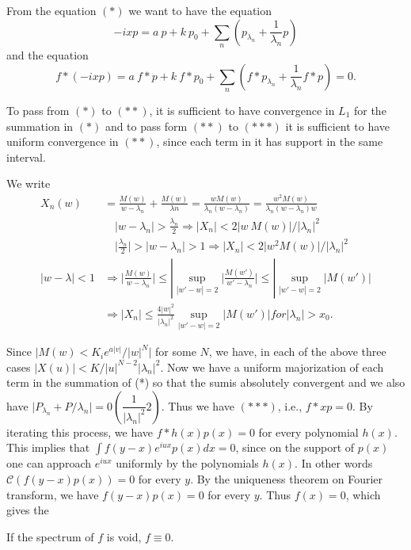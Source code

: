 From the equation $(*)$ we want to have the equation
\begin{equation}
 - ixp = a ~ p+ k ~ p_0 + \sum_n (p_{\lambda_n} + \frac{1}{\lambda_n} p) \tag{**}
\end{equation}
and the equation
\begin{equation}
 f * (-ixp) = a ~ f * p + k ~ f * p_0 + \sum_n (f * p_{\lambda_n} +
 \frac{1}{\lambda_n} f * p) = 0. \tag{***} 
\end{equation}

To pass from $(*)$ to $(**)$, it is sufficient to have convergence in
$L_1$ for the summation in $(*)$ and to pass form $(**)$ to $(***)$
it is sufficient to have uniform convergence in $(**)$, since each
term in it has support in the same interval. 

We write
\begin{align*}
X_n (w) & = \frac{M(w)}{w - \lambda_n} + \frac{M(w)}{\lambda n} =
\frac{w M(w)}{\lambda_n (w - \lambda_n)} = \frac{w^2 M(w)}{\lambda_n
 (w - \lambda_n)w} \\
 & \quad \big| w - \lambda_n \big| > \frac{\lambda_n}{2} \Rightarrow
 \big| X_n \big| < 2 \big| w ~ M(w) \big| / \big| \lambda_n
 \big|^2 \tag{1}\label{chap5:sec1eq1} \\
 & \quad \big| \frac{\lambda_n}{2}\big| > \big| w- \lambda_n \big|
 > 1 \Rightarrow \big| X_n \big| < 2 \big| w^2 M (w)
 \big| / \big| \lambda_n \big|^2 \tag{2}\label{chap5:sec1:eq2} \\
\big| w- \lambda \big| < 1 &\Rightarrow \big| \frac{M(w)}{w -
 \lambda_n} \big| \leq | \sup_{|w' - w| = 2} \big| \frac{M(w')}{w' -
 \lambda_n} \big| \leq | \sup_{|w'-w| = 2} \big| M(w') \big| \\
 & \Rightarrow \big| X_n \big| \leq \frac{4 | w |^2}{| \lambda_n
 |^2 } \sup\limits_{\big| w' - w\big| = 2} \big| M(w') \big| for
 \big| \lambda_n \big| > x_0. \tag{3}\label{chap5:sec1:eq3} 
\end{align*}

Since $\big| M (w) < K_i e^{a |v|} / |w|^N \big|$ for some $N$,
we have, in each of the above three cases $\big| X (u) \big| <
K/ \big| u \big|^{N-2} \big| \lambda_n \big|^2$. Now we have a
uniform majorization of each term in the summation of (*) so that
the sum\pageoriginale is absolutely convergent and we also have $\Big| P_{
 \lambda_n} + P/{\lambda_n}\Big| = 0 (\dfrac{1}{| \lambda_n|^2}
2)$. Thus we have $(***)$, i.e., $f * xp = 0$. By iterating this
process, we have $f * h (x) p(x) = 0$ for every polynomial
$h(x)$. This implies that $\int f (y - x) e^{iux} p (x) dx = 0$, since
on the support of $p(x)$ one can approach $e^{iux}$ uniformly by the
polynomials $h(x)$. In other words $\mathscr{C} (f(y -x) p (x)) = 0$
for every $y$. By the uniqueness theorem on Fourier transform, we have
$f(y - x) p (x) = 0$ for every $y$. Thus $f(x) = 0$, which gives the 
\begin{lemma*}
 If the spectrum of $f$ is void, $f \equiv 0$.
\end{lemma*}

